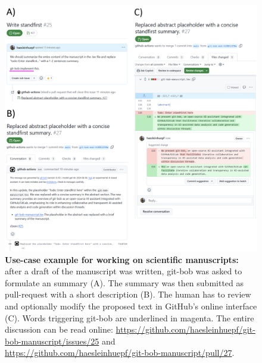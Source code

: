 \documentclass[sn-mathphys-num]{sn-jnl}%
\theoremstyle{thmstyleone}%
\theoremstyle{thmstyletwo}%
\theoremstyle{thmstylethree}%
\begin{document}
\begin{appendices}
\begin{figure}[h]
\centering
\includegraphics[width=\textwidth]{example_standfirst_generation.png}
\caption{\textbf{Use-case example for working on scientific manuscripts:} after a draft of the manuscript was written, git-bob was asked to formulate an summary (A). The summary was then submitted as pull-request with a short description (B). The human has to review and optionally modify the proposed text in GitHub's online interface (C). Words triggering git-bob are underlined in magenta. The entire discussion can be read online: \url{https://github.com/haesleinhuepf/git-bob-manuscript/issues/25} and \url{https://github.com/haesleinhuepf/git-bob-manuscript/pull/27}.
\newline
\newline
}
\label{fig:xample_abstract_generation}
\end{figure}

\end{appendices}



\end{document}
